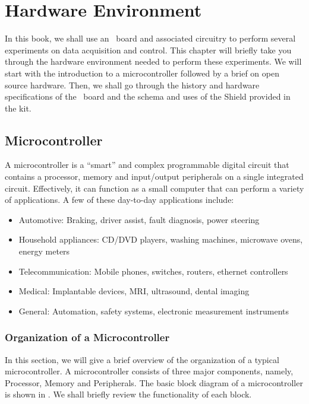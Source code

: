 \chapter{Hardware Environment}
\thispagestyle{empty}
\label{sec:hw-env}
\newcommand{\LocHWfig}{\Origin/user-code/hw-env/figures}
\newcommand{\LocHWscicode}{\Origin/user-code/hw-env/scilab}
\newcommand{\LocHWscibrief}{Origin/user-code/hw-env/scilab}
\newcommand{\LocHWardcode}{\Origin/user-code/hw-env/arduino}
\newcommand{\LocHWardbrief}{\tt Origin/user-code/hw-env/arduino}
\newcommand{\LocSH}{\Origin/tools/shield}
\newcommand{\LocSHbrief}[1]{{\tt Origin/tools/shield/#1}, see \fnrefp{fn:file-loc}}

In this book, we shall use an \arduino\ board and associated circuitry
to perform several experiments on data acquisition and control. This
chapter will briefly take you through the hardware environment needed
to perform these experiments. We will start with the introduction to a
microcontroller followed by a brief on open source hardware. Then, we
shall go through the history and hardware specifications of the
\arduino\ board and the schema and uses of the Shield provided in
the kit.


\section{Microcontroller}
A microcontroller is a ``smart'' and complex programmable digital circuit
that contains a processor, memory and input/output peripherals on a
single integrated circuit. Effectively, it can function as a small
computer that can perform a variety of applications. A few of these
day-to-day applications include:
\begin{itemize}
  \item Automotive: Braking, driver assist, fault diagnosis, power
        steering
  \item Household appliances: CD/DVD players, washing machines,
        microwave ovens, energy meters
  \item Telecommunication: Mobile phones, switches, routers, ethernet
        controllers
  \item Medical: Implantable devices, MRI, ultrasound, dental imaging
  \item General: Automation, safety systems, electronic measurement
        instruments
\end{itemize}

\subsection{Organization of a Microcontroller}
In this section, we will give a brief overview of the organization of
a typical microcontroller.  A microcontroller consists of three major
components, namely, Processor, Memory and Peripherals. The basic block
diagram of a microcontroller is shown in . We shall
briefly review the functionality of each block.

